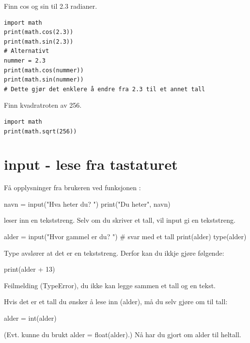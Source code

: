 \begin{exercise}
Finn cos og sin til 2.3 radianer.
\end{exercise}
\begin{solution}
\begin{lstlisting}
import math
print(math.cos(2.3))
print(math.sin(2.3))
# Alternativt
nummer = 2.3
print(math.cos(nummer))
print(math.sin(nummer))
# Dette gjør det enklere å endre fra 2.3 til et annet tall
\end{lstlisting}
\end{solution}

\begin{exercise}
Finn kvadratroten av 256.
\end{exercise}
\begin{solution}
\begin{lstlisting}
import math
print(math.sqrt(256))
\end{lstlisting}
\end{solution}

\section{input - lese fra tastaturet}

Få opplysninger fra brukeren ved funksjonen :
\begin{usncodebox}
navn = input("Hva heter du? ") 
print("Du heter", navn)
\end{usncodebox}

 leser inn en tekststreng. Selv om du skriver et tall, vil input gi en tekststreng.
\begin{usncodebox}
alder = input("Hvor gammel er du? ")   # svar med et tall 
print(alder)
type(alder)
\end{usncodebox}

Type avslører at det er en tekststreng. Derfor kan du ikkje gjøre følgende:
\begin{usncodebox}
print(alder + 13)
\end{usncodebox}

Feilmelding (TypeError), du ikke kan legge sammen et tall og en tekst. 

Hvis det er et tall du ønsker å lese inn (alder), må du selv gjøre om til tall:
\begin{usncodebox}
alder = int(alder)
\end{usncodebox}

(Evt. kunne du brukt alder = float(alder).) Nå har du gjort om alder til heltall.

